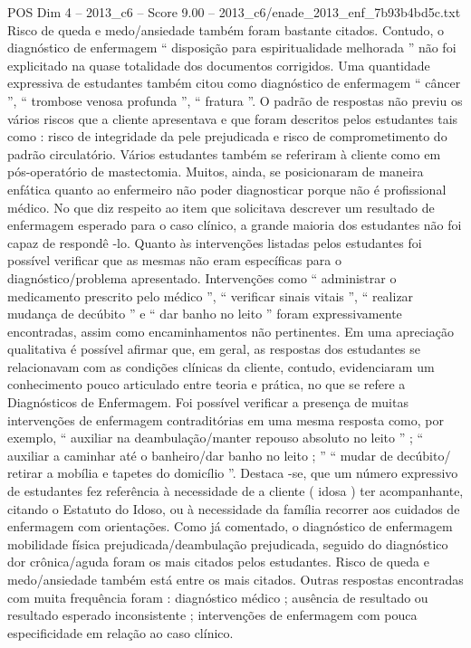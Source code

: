 \begin{textsample}{POS Dim 4 – 2013\_c6 – Score 9.00 – 2013\_c6/enade\_2013\_enf\_7b93b4bd5c.txt}
Risco de queda e medo/ansiedade também foram bastante citados.
Contudo, o diagnóstico de enfermagem “ disposição para espiritualidade melhorada ” não foi explicitado na quase totalidade dos documentos corrigidos.
Uma quantidade expressiva de estudantes também citou como diagnóstico de enfermagem “ câncer ”, “ trombose venosa profunda ”, “ fratura ”.
O padrão de respostas não previu os vários riscos que a cliente apresentava e que foram descritos pelos estudantes tais como : risco de integridade da pele prejudicada e risco de comprometimento do padrão circulatório.
Vários estudantes também se referiram à cliente como em pós-operatório de mastectomia.
Muitos, ainda, se posicionaram de maneira enfática quanto ao enfermeiro não poder diagnosticar porque não é profissional médico.
No que diz respeito ao item que solicitava descrever um resultado de enfermagem esperado para o caso clínico, a grande maioria dos estudantes não foi capaz de respondê -lo.
Quanto às intervenções listadas pelos estudantes foi possível verificar que as mesmas não eram específicas para o diagnóstico/problema apresentado.
Intervenções como “ administrar o medicamento prescrito pelo médico ”, “ verificar sinais vitais ”, “ realizar mudança de decúbito ” e “ dar banho no leito ” foram expressivamente encontradas, assim como encaminhamentos não pertinentes.
Em uma apreciação qualitativa é possível afirmar que, em geral, as respostas dos estudantes se relacionavam com as condições clínicas da cliente, contudo, evidenciaram um conhecimento pouco articulado entre teoria e prática, no que se refere a Diagnósticos de Enfermagem.
Foi possível verificar a presença de muitas intervenções de enfermagem contraditórias em uma mesma resposta como, por exemplo, “ auxiliar na deambulação/manter repouso absoluto no leito ” ; “ auxiliar a caminhar até o banheiro/dar banho no leito ; ” “ mudar de decúbito/ retirar a mobília e tapetes do domicílio ”.
Destaca -se, que um número expressivo de estudantes fez referência à necessidade de a cliente ( idosa ) ter acompanhante, citando o Estatuto do Idoso, ou à necessidade da família recorrer aos cuidados de enfermagem com orientações.
Como já comentado, o diagnóstico de enfermagem mobilidade física prejudicada/deambulação prejudicada, seguido do diagnóstico dor crônica/aguda foram os mais citados pelos estudantes.
Risco de queda e medo/ansiedade também está entre os mais citados.
Outras respostas encontradas com muita frequência foram : diagnóstico médico ; ausência de resultado ou resultado esperado inconsistente ; intervenções de enfermagem com pouca especificidade em relação ao caso clínico.

\end{textsample}
